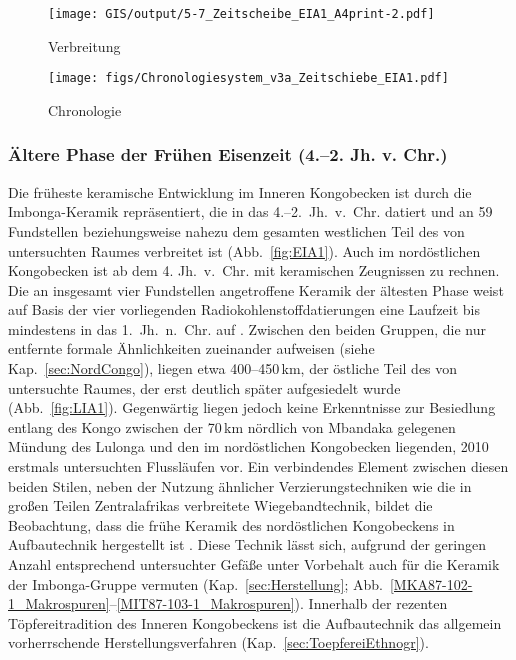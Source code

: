 \begin{figure*}[p]
	\centering
	\begin{subfigure}[b]{\textwidth}
		\centering
		\texttt{[image: GIS/output/5-7\_Zeitscheibe\_EIA1\_A4print-2.pdf]}
		\vspace{2cm}
		\caption{Verbreitung}
		\label{fig:EIA1_Karte}
	\end{subfigure}
	\caption{Ältere Phase der Frühe Eisenzeit (4.--2. Jh. v. Chr.).}
	\label{}
\end{figure*}
\addtocounter{figure}{-1}
\begin{figure*}[p]
	\begin{subfigure}[b]{\textwidth}
		\setcounter{subfigure}{1}
		\centering
		\texttt{[image: figs/Chronologiesystem\_v3a\_Zeitschiebe\_EIA1.pdf]}
		\caption{Chronologie}
		\label{fig:EIA1_Chronologie}
	\end{subfigure}
	\caption{Ältere Phase der Frühe Eisenzeit (4.--2. Jh. v. Chr.).}
	\label{fig:EIA1}
\end{figure*}

\subsubsection*{Ältere Phase der Frühen Eisenzeit (4.--2. Jh. v. Chr.)}

Die früheste keramische Entwicklung im Inneren Kongobecken ist durch die Imbonga-Keramik \parencite[59--68]{Wotzka.1995} repräsentiert, die in das 4.--2.~Jh.~v.~Chr. datiert und an 59 Fundstellen beziehungsweise nahezu dem gesamten westlichen Teil des von \textcite{Wotzka.1995} untersuchten Raumes verbreitet ist (Abb.~\ref{fig:EIA1}). Auch im nordöstlichen Kongobecken ist ab dem 4. Jh.~v.~Chr. mit keramischen Zeugnissen zu rechnen. Die an insgesamt vier Fundstellen angetroffene Keramik der ältesten Phase weist auf Basis der vier vorliegenden Radiokohlenstoffdatierungen eine Laufzeit bis mindestens in das 1.~Jh.~n.~Chr. auf \parencite[17 Abb.~23]{LivingstoneSmith.2017}. Zwischen den beiden Gruppen, die nur entfernte formale Ähnlichkeiten zueinander aufweisen (siehe Kap.~\ref{sec:NordCongo}), liegen etwa 400--450\,km, der östliche Teil des von \textcite{Wotzka.1995} untersuchte Raumes, der erst deutlich später aufgesiedelt wurde (Abb.~\ref{fig:LIA1}). Gegenwärtig liegen jedoch keine Erkenntnisse zur Besiedlung entlang des Kongo zwischen der 70\,km nördlich von Mbandaka gelegenen Mündung des Lulonga und den im nordöstlichen Kongobecken liegenden, 2010 erstmals untersuchten Flussläufen vor. Ein verbindendes Element zwischen diesen beiden Stilen, neben der Nutzung ähnlicher Verzierungstechniken wie die in großen Teilen Zentralafrikas verbreitete Wiegebandtechnik, bildet die Beobachtung, dass die frühe Keramik des nordöstlichen Kongobeckens in Aufbautechnik hergestellt ist \parencite[16]{LivingstoneSmith.2017}. Diese Technik lässt sich, aufgrund der geringen Anzahl entsprechend untersuchter Gefäße unter Vorbehalt auch für die Keramik der Imbonga-Gruppe vermuten (Kap.~\ref{sec:Herstellung}; Abb.~\ref{MKA87-102-1_Makrospuren}--\ref{MIT87-103-1_Makrospuren}). Innerhalb der rezenten Töpfereitradition des Inneren Kongobeckens ist die Aufbautechnik das allgemein vorherrschende Herstellungsverfahren (Kap.~\ref{sec:ToepfereiEthnogr}). 

